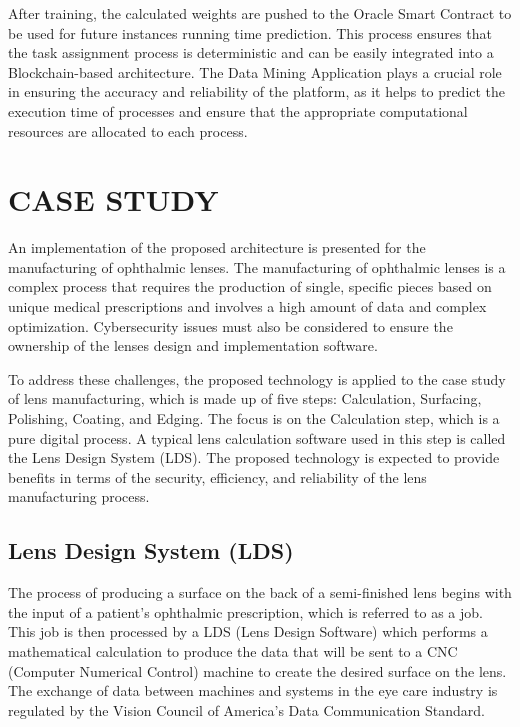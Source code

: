\documentclass[10pt,a4paper]{report}
\begin{document}
\large\justify After training, the calculated weights are pushed to the Oracle Smart Contract to be used for future instances running time prediction. This process ensures that the task assignment process is deterministic and can be easily integrated into a Blockchain-based architecture. The Data Mining Application plays a crucial role in ensuring the accuracy and reliability of the platform, as it helps to predict the execution time of processes and ensure that the appropriate computational resources are allocated to each process.
\newpage
\chapter{CASE STUDY}

\large\justify An implementation of the proposed architecture is presented for the manufacturing of ophthalmic lenses. The manufacturing of ophthalmic lenses is a complex process that requires the production of single, specific pieces based on unique medical prescriptions and involves a high amount of data and complex optimization. Cybersecurity issues must also be considered to ensure the ownership of the lenses design and implementation software.

\large\justify To address these challenges, the proposed technology is applied to the case study of lens manufacturing, which is made up of five steps: Calculation, Surfacing, Polishing, Coating, and Edging. The focus is on the Calculation step, which is a pure digital process. A typical lens calculation software used in this step is called the Lens Design System (LDS). The proposed technology is expected to provide benefits in terms of the security, efficiency, and reliability of the lens manufacturing process.

\section{Lens Design System (LDS)}
\large\justify The process of producing a surface on the back of a semi-finished lens begins with the input of a patient's ophthalmic prescription, which is referred to as a job. This job is then processed by a LDS (Lens Design Software) which performs a mathematical calculation to produce the data that will be sent to a CNC (Computer Numerical Control) machine to create the desired surface on the lens. The exchange of data between machines and systems in the eye care industry is regulated by the Vision Council of America's Data Communication Standard.
\end{document}
